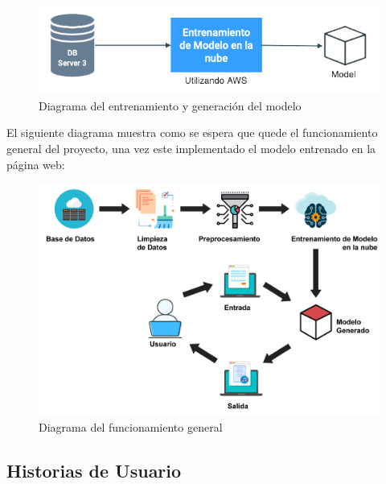 \documentclass[12pt, a4paper, titlepage]{report}
\begin{document}
		\begin{figure}[H] \caption{Diagrama del entrenamiento y generación del modelo}
			\includegraphics[scale=.5]{./imagenes/Disenio/Arquitectura/DiagramaFuncGen 2.png}
			\centering 
		\end{figure}	
	
		El siguiente diagrama muestra como se espera que quede el funcionamiento general del proyecto, una vez este implementado el modelo entrenado en la página web:
		
		\begin{figure}[H] \caption{Diagrama del funcionamiento general}
			\includegraphics[scale=.25]{./imagenes/Disenio/Arquitectura/Arquitectura sistema.png}
			\centering 
		\end{figure}
	
		\subsection{Historias de Usuario}
		
\end{document}
